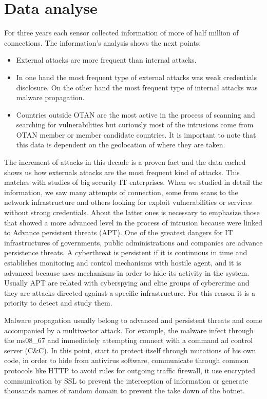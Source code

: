 \documentclass[a4paper]{llncs}
\begin{document}
\section{Data analyse}
For three years each sensor collected information of more of half million of connections. The information's analysis shows the next points:
\begin{itemize}
\item External attacks are more frequent than internal attacks.
\item In one hand the most frequent type of external attacks was weak credentials disclosure. On the other hand the most frequent type of internal attacks was malware propagation.
\item Countries outside OTAN are the most active in the process of scanning and searching for vulnerabilities but curiously most of the intrusions come from OTAN member or member candidate countries. It is important to note that this data is dependent on the geolocation of where they are taken.
\end{itemize}

The increment of attacks in this decade is a proven fact and the data cached shows us how externals attacks are the most frequent kind of attacks. This matches with studies of big security IT enterprises\cite{verizon-2015}. When we studied in detail the information, we saw many attempts of connection, some from scans to the network infrastructure and others looking for exploit vulnerabilities or services without strong credentials. About the latter ones is necessary to emphasize those that showed a more advanced level in the process of intrusion because were linked to Advance persistent threats (APT). One of the greatest dangers for IT infrastructures of governments, public administrations and companies are advance persistence threats. A cyberthreat is persistent if it is continuous in time and establishes monitoring and control mechanisms with hostile agent, and it is advanced because uses mechanisms in order to hide its activity in the system. Usually APT are related with cyberspying and elite groups of cybercrime and they are attacks directed against a specific infrastructure. For this reason it is a priority to detect and study them.

Malware propagation usually belong to advanced and persistent threats and come accompanied by a multivector attack. For example, the malware infect through the ms08\_67 and immediately attempting connect with a command ad control server (C\&C). In this point, start to protect itself through mutations of his own code, in order to hide from antivirus software, communicate through common protocols like HTTP to avoid rules for outgoing traffic firewall, it use encrypted communication by SSL to prevent the interception of information or generate thousands names of random domain to prevent the take down of the botnet.
\end{document}
